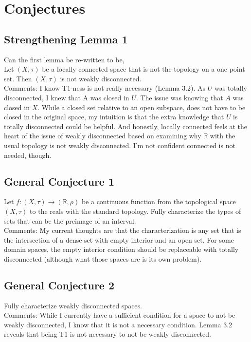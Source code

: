 \documentclass{article}
\begin{document}
\section{Conjectures}
\subsection{Strengthening Lemma 1}
Can the first lemma be re-written to be,\\

Let $(X,\tau)$ be a locally connected space that is not the topology on a one point set. Then $(X,\tau)$ is not weakly disconnected.\\

Comments: I know T1-ness is not really necessary (Lemma 3.2). As $U$ was totally disconnected, I knew that A was closed in $U$. The issue was knowing that $A$ was closed in $X$. While a closed set relative to an open subspace, does not have to be closed in the original space, my intuition is that the extra knowledge that $U$ is totally disconnected could be helpful. And honestly, locally connected feels at the heart of the issue of weakly disconnected based on examining why $\mathbb{R}$ with the usual topology is not weakly disconnected. I'm not confident connected is not needed, though.

\subsection{General Conjecture 1}
Let $f: (X,\tau) \to (\mathbb{R},\rho)$ be a continuous function from the topological space $(X,\tau)$ to the reals with the standard topology. Fully characterize the types of sets that can be the preimage of an interval.\\

Comments: My current thoughts are that the characterization is any set that is the intersection of a dense set with empty interior and an open set. For some domain spaces, the empty interior condition should be replaceable with totally disconnected (although what those spaces are is its own problem).

\subsection{General Conjecture 2}
Fully characterize weakly disconnected spaces.\\

Comments: While I currently have a sufficient condition for a space to not be weakly disconnected, I know that it is not a necessary condition. Lemma 3.2 reveals that being T1 is not necessary to not be weakly disconnected.
\end{document}
